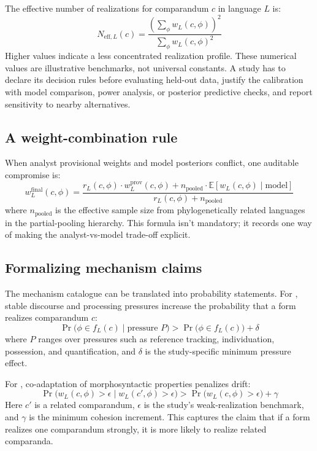 \documentclass[12pt]{article}
\begin{document}
The effective number of realizations for comparandum $c$ in language $L$ is:
\[
N_{\text{eff},L}(c) = \frac{\left(\sum_{\phi} w_L(c,\phi)\right)^2}{\sum_{\phi} w_L(c,\phi)^2}
\]
Higher values indicate a less concentrated realization profile. These numerical values are illustrative benchmarks, not universal constants. A study has to declare its decision rules before evaluating held-out data, justify the calibration with model comparison, power analysis, or posterior predictive checks, and report sensitivity to nearby alternatives.

\subsection{A weight-combination rule}\label{subsec:weight-combination}

When analyst provisional weights and model posteriors conflict, one auditable compromise is:
\[
w_L^{\text{final}}(c,\phi) = \frac{r_L(c,\phi) \cdot w_L^{\text{prov}}(c,\phi) + n_{\text{pooled}} \cdot \mathbb{E}[w_L(c,\phi) \mid \text{model}]}{r_L(c,\phi) + n_{\text{pooled}}}
\]
where $n_{\text{pooled}}$ is the effective sample size from phylogenetically related languages in the partial-pooling hierarchy. This formula isn't mandatory; it records one way of making the analyst-vs-model trade-off explicit.

\subsection{Formalizing mechanism claims}\label{subsec:mechanism-formal}

The mechanism catalogue can be translated into probability statements. For , stable discourse and processing pressures increase the probability that a form realizes comparandum $c$:
\[
  \Pr\big(\phi \in f_L(c) \mid \text{pressure } P\big) > \Pr\big(\phi \in f_L(c)\big) + \delta
\]
where $P$ ranges over pressures such as reference tracking, individuation, possession, and quantification, and $\delta$ is the study-specific minimum pressure effect.

For , co-adaptation of morphosyntactic properties penalizes drift:
\[
  \Pr\big(w_L(c,\phi) > \epsilon \mid w_L(c',\phi) > \epsilon\big) > \Pr\big(w_L(c,\phi) > \epsilon\big) + \gamma
\]
Here $c'$ is a related comparandum, $\epsilon$ is the study's weak-realization benchmark, and $\gamma$ is the minimum cohesion increment. This captures the claim that if a form realizes one comparandum strongly, it is more likely to realize related comparanda.
\end{document}
